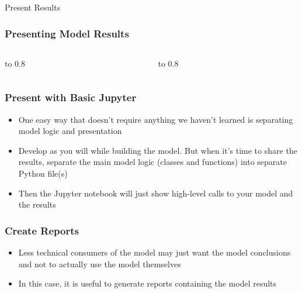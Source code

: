 \documentclass[handout, 11pt]{beamer}
\begin{document}
\begin{section}{Present Results}
\begin{frame}
\frametitle{Presenting Model Results}
\begin{columns}
\begin{column}{0.5\textwidth}
\vbox to 0.8
\end{column}
\begin{column}{0.5\textwidth}
\vbox to 0.8
\end{column}
\end{columns}
\end{frame}
\begin{frame}
\frametitle{Present with Basic Jupyter}
\begin{itemize}
\item One easy way that doesn't require anything we haven't learned is separating model logic and presentation
\vfill
\item Develop as you will while building the model. But when it's time to share the results, separate the main model logic (classes and functions) into separate Python file(s)
\vfill
\item Then the Jupyter notebook will just show high-level calls to your model and the results
\end{itemize}
\end{frame}
\begin{frame}
\frametitle{Create Reports}
\begin{itemize}
\item Less technical consumers of the model may just want the model conclusions and not to actually use the model themselves
\vfill
\item In this case, it is useful to generate reports containing the model results
\vfill

\end{itemize}
\end{frame}
\end{section}
\end{document}
